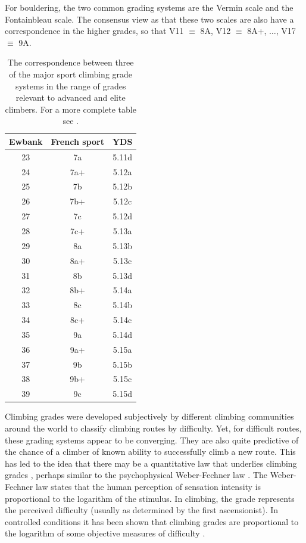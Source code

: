 \documentclass{article}
\begin{document}
{For bouldering, the two common grading systems are the Vermin scale and the Fontainbleau scale. The consensus view as that these two scales are also have a correspondence in the higher grades, so that V11 $\equiv$ 8A, V12 $\equiv$ 8A+, $\dots$, V17 $\equiv$ 9A.


\begin{table}
\centering
\begin{tabular}{| c | c | c |}
  \hline			
  {\bf Ewbank} & {\bf French sport} & {\bf YDS} \\
  \hline			
  23 & 7a & 5.11d \\
  24 & 7a+ & 5.12a \\
  25 & 7b & 5.12b \\
  26 & 7b+ & 5.12c \\
  27 & 7c & 5.12d \\
  28 & 7c+ & 5.13a \\
  29 & 8a & 5.13b \\
  30 & 8a+ & 5.13c \\
  31 & 8b & 5.13d \\
  32 & 8b+ & 5.14a \\
  33 & 8c & 5.14b \\
  34 & 8c+ & 5.14c \\
  35 & 9a & 5.14d \\
  36 & 9a+ & 5.15a \\
  37 & 9b & 5.15b \\
  38 & 9b+ & 5.15c \\
  39 & 9c & 5.15d \\
  \hline  
\end{tabular}
\caption{The correspondence between three of the major sport climbing grade systems in the range of grades relevant to advanced and elite climbers. For a more complete table see \cite{draper2015comparative}. }
\label{table1}
\end{table}

Climbing grades were developed subjectively by different climbing communities around the world to classify climbing routes by difficulty. Yet, for difficult routes, these grading systems appear to be converging. They are also quite predictive of the chance of a climber of known ability to successfully climb a new route.  This has led to the idea that there may be a quantitative law that underlies climbing grades \cite{delignieres1993psychophysical}, perhaps similar to the psychophysical Weber-Fechner law \cite{1834pulsu,fechner1860}. The Weber-Fechner law states that the human perception of sensation intensity is proportional to the logarithm of the stimulus.  In climbing, the grade represents the perceived difficulty (usually as determined by the first ascensionist). In controlled conditions it has been shown that climbing grades are proportional to the logarithm of some objective measures of difficulty \cite{delignieres1993psychophysical}. 

}
\end{document}
